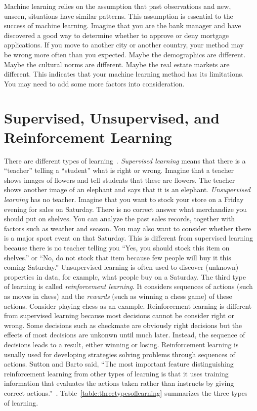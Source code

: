 Machine learning relies on the assumption that past observations and
new, unseen, situations have similar patterns.  This assumption is
essential to the success of machine learning.  Imagine that you are
the bank manager and have discovered a good way to determine whether
to approve or deny mortgage applications.  If you move to another city
or another country, your method may be wrong more often than you
expected. Maybe the demographics are different. Maybe the cultural
norms are different.  Maybe the real estate markets are different.
This indicates that your machine learning method has its limitations.
You may need to add some more factors into consideration.



\section{Supervised, Unsupervised, and Reinforcement Learning}

There are different types of
learning~\cite{Goodfellow2016DeepLearning,
  Sutton2017ReinforcementLearningIntroduction}.  {\it Supervised
  learning} means that there is a ``teacher'' telling a ``student''
what is right or wrong. Imagine that a teacher shows images of flowers
and tell students that these are flowers. The teacher shows another
image of an elephant and says that it is an elephant.  {\it
  Unsupervised learning} has no teacher. Imagine that you want to
stock your store on a Friday evening for sales on Saturday.  There is
no correct answer what merchandize you should put on shelves.  You can
analyze the past sales records, together with factors such as weather
and season.  You may also want to consider whether there is a major
sport event on that Saturday.  This is different from supervised
learning because there is no teacher telling you ``Yes, you should
stock this item on shelves.''  or ``No, do not stock that item because
few people will buy it this coming Saturday.''  Unsupervised learning
is often used to discover (unknown) properties in data, for example,
what people buy on a Saturday.  The third type of learning is called
{\it reinforcement learning}.  It considers sequences of actions (such
as moves in chess) and the {\it rewards} (such as winning a chess
game) of these actions.  Consider playing chess as an example.
Reinforcement learning is different from supervised learning because
most decisions cannot be consider right or wrong. Some decisions such
as checkmate are obviously right decisions but the effects of most
decisions are unkonwn until much later. Instead, the sequence of
decisions leads to a result, either winning or losing. Reinforcement
learning is usually used for developing strategies solving problems
through sequences of actions.  Sutton and Barto said, ``The most
important feature distinguishing reinforcement learning from other
types of learning is that it uses training information that evaluates
the actions taken rather than instructs by giving correct
actions.''~\cite{Sutton2017ReinforcementLearningIntroduction}.
Table~\ref{table:threetypesoflearning} summarizes the three types of
learning.

